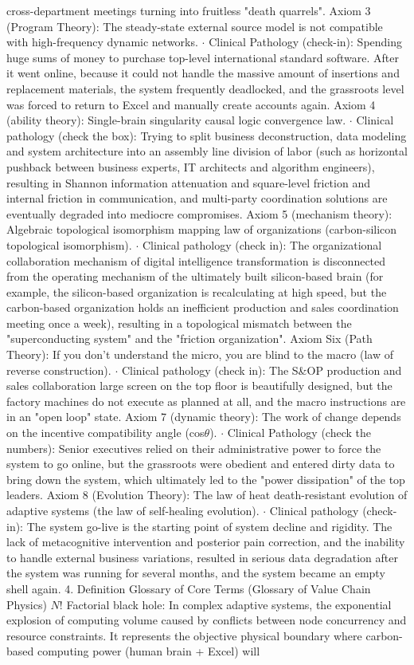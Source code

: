 \documentclass[11pt,a4paper]{article}
\begin{document}
cross-department meetings turning into fruitless "death quarrels". Axiom 3 (Program Theory): The steady-state external source model is not compatible with high-frequency dynamic networks. $\cdot$ Clinical Pathology (check-in): Spending huge sums of money to purchase top-level international standard software. After it went online, because it could not handle the massive amount of insertions and replacement materials, the system frequently deadlocked, and the grassroots level was forced to return to Excel and manually create accounts again. Axiom 4 (ability theory): Single-brain singularity causal logic convergence law. $\cdot$ Clinical pathology (check the box): Trying to split business deconstruction, data modeling and system architecture into an assembly line division of labor (such as horizontal pushback between business experts, IT architects and algorithm engineers), resulting in Shannon information attenuation and square-level friction and internal friction in communication, and multi-party coordination solutions are eventually degraded into mediocre compromises. Axiom 5 (mechanism theory): Algebraic topological isomorphism mapping law of organizations (carbon-silicon topological isomorphism). $\cdot$ Clinical pathology (check in): The organizational collaboration mechanism of digital intelligence transformation is disconnected from the operating mechanism of the ultimately built silicon-based brain (for example, the silicon-based organization is recalculating at high speed, but the carbon-based organization holds an inefficient production and sales coordination meeting once a week), resulting in a topological mismatch between the "superconducting system" and the "friction organization". Axiom Six (Path Theory): If you don’t understand the micro, you are blind to the macro (law of reverse construction). $\cdot$ Clinical pathology (check in): The S\&OP production and sales collaboration large screen on the top floor is beautifully designed, but the factory machines do not execute as planned at all, and the macro instructions are in an "open loop" state. Axiom 7 (dynamic theory): The work of change depends on the incentive compatibility angle (cos$\theta$). $\cdot$ Clinical Pathology (check the numbers): Senior executives relied on their administrative power to force the system to go online, but the grassroots were obedient and entered dirty data to bring down the system, which ultimately led to the "power dissipation" of the top leaders. Axiom 8 (Evolution Theory): The law of heat death-resistant evolution of adaptive systems (the law of self-healing evolution). $\cdot$ Clinical pathology (check-in): The system go-live is the starting point of system decline and rigidity. The lack of metacognitive intervention and posterior pain correction, and the inability to handle external business variations, resulted in serious data degradation after the system was running for several months, and the system became an empty shell again. 4. Definition Glossary of Core Terms (Glossary of Value Chain Physics) $N!$ Factorial black hole: In complex adaptive systems, the exponential explosion of computing volume caused by conflicts between node concurrency and resource constraints. It represents the objective physical boundary where carbon-based computing power (human brain + Excel) will 
\end{document}
